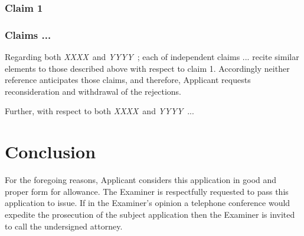 \documentclass[11pt,letterpaper,oneside]{article}
\newcommand{\xxxx}{{\em XXXX}\ }
\newcommand{\yyyy}{{\em YYYY}\ }
\begin{document}
{\subsubsection{Claim 1}

% 
% 


\subsubsection{Claims ...}

Regarding both \xxxx and \yyyy; each of independent
claims ... recite similar elements to those described above
with respect to claim 1.  Accordingly neither reference anticipates
those claims, and therefore, Applicant requests reconsideration and
withdrawal of the rejections.

Further, with respect to both \xxxx and \yyyy...

\section{Conclusion}

For the foregoing reasons, Applicant considers this application in good
and proper form for allowance.  The Examiner is respectfully requested
to pass this application to issue.  If in the Examiner's opinion a
telephone conference would expedite the prosecution of the subject
application then the Examiner is invited to call the undersigned
attorney.\\


} %

\Signature


\end{document}
